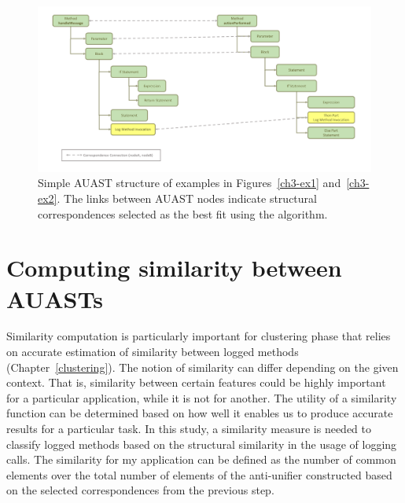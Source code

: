 \begin{figure} [H]
  \centering\includegraphics [width = \textwidth]{Drawing4/FinalCorr.pdf}
  \caption{Simple AUAST structure of examples in Figures~\ref{ch3-ex1} and~\ref{ch3-ex2}. The links between AUAST nodes indicate structural correspondences selected as the best fit using the  algorithm.}
  \label{fig:AUASTs}
\end{figure}

\section{Computing similarity between AUASTs} \label{meth-similarity}
Similarity computation is particularly important for clustering phase that relies on accurate estimation of similarity between logged methods (Chapter~\ref{clustering}). The notion of similarity can differ depending on the given context. That is, similarity between certain features could be highly important for a particular application, while it is not for another. The utility of a similarity function can be determined based on how well it enables us to produce accurate results for a particular task. In this study, a similarity measure is needed to classify logged methods based on the structural similarity in the usage of logging calls. The similarity for my application can be defined as the number of common elements over the total number of elements of the anti-unifier constructed based on the selected correspondences from the previous step.

